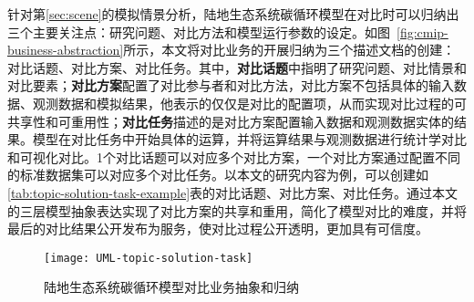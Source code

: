 针对第\ref{sec:scene}的模拟情景分析，陆地生态系统碳循环模型在对比时可以归纳出三个主要关注点：研究问题、对比方法和模型运行参数的设定。如图~\ref{fig:cmip-business-abstraction}所示，本文将对比业务的开展归纳为三个描述文档的创建：对比话题、对比方案、对比任务。其中，\textbf{对比话题}中指明了研究问题、对比情景和对比要素；\textbf{对比方案}配置了对比参与者和对比方法，对比方案不包括具体的输入数据、观测数据和模拟结果，他表示的仅仅是对比的配置项，从而实现对比过程的可共享性和可重用性；\textbf{对比任务}描述的是对比方案配置输入数据和观测数据实体的结果。模型在对比任务中开始具体的运算，并将运算结果与观测数据进行统计学对比和可视化对比。1个对比话题可以对应多个对比方案，一个对比方案通过配置不同的标准数据集可以对应多个对比任务。以本文的研究内容为例，可以创建如\ref{tab:topic-solution-task-example}表的对比话题、对比方案、对比任务。通过本文的三层模型抽象表达实现了对比方案的共享和重用，简化了模型对比的难度，并将最后的对比结果公开发布为服务，使对比过程公开透明，更加具有可信度。

\begin{figure}[!htbp]
    \centering
    \texttt{[image: UML-topic-solution-task]}
    \caption{陆地生态系统碳循环模型对比业务抽象和归纳}
    \label{fig:UML-topic-solution-task}
\end{figure}


